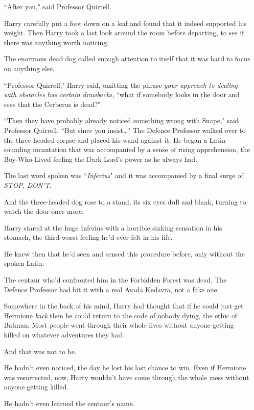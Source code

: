 ``After you," said Professor Quirrell.

Harry carefully put a foot down on a leaf and found that it indeed supported his weight. Then Harry took a last look around the room before departing, to see if there was anything worth noticing.

The enormous dead dog called enough attention to itself that it was hard to focus on anything else.

``Professor Quirrell," Harry said, omitting the phrase \emph{your approach to dealing with obstacles has certain drawbacks}, ``what if somebody looks in the door and sees that the Cerberus is dead?"

``Then they have probably already noticed something wrong with Snape," said Professor Quirrell. ``But since you insist{\ldots}" The Defence Professor walked over to the three-headed corpse and placed his wand against it. He began a Latin-sounding incantation that was accompanied by a sense of rising apprehension, the Boy-Who-Lived feeling the Dark Lord's power as he always had.

The last word spoken was ``\emph{Inferius}" and it was accompanied by a final surge of \emph{STOP, DON'T}.

And the three-headed dog rose to a stand, its six eyes dull and blank, turning to watch the door once more.

Harry stared at the huge Inferius with a horrible sinking sensation in his stomach, the third-worst feeling he'd ever felt in his life.

He knew then that he'd seen and sensed this procedure before, only without the spoken Latin.

The centaur who'd confronted him in the Forbidden Forest was dead. The Defence Professor had hit it with a real Avada Kedavra, not a fake one.

Somewhere in the back of his mind, Harry had thought that if he could just get Hermione \emph{back} then he could return to the code of nobody dying, the ethic of Batman. Most people went through their whole lives without anyone getting killed on whatever adventures they had.

And that was not to be.

He hadn't even noticed, the day he lost his last chance to win. Even if Hermione was resurrected, now, Harry wouldn't have come through the whole mess without anyone getting killed.

He hadn't even learned the centaur's name.

